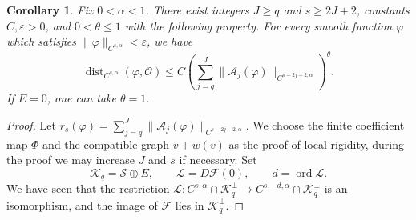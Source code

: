 \documentclass[11pt,reqno]{amsart}
\theoremstyle{corollary}
\newtheorem{corollary}[theorem]{Corollary}
\theoremstyle{conjecture}
\theoremstyle{assumption}
\theoremstyle{proposition}
\theoremstyle{remark}
\numberwithin{equation}{section}
\begin{document}
\begin{corollary}\label{cor:quantitative-rigidity}
Fix $0<\alpha<1$. There exist integers $J\geq q$ and $s\geq 2J+2$, constants $C,\varepsilon>0$, and $0<\theta\leq1$ with the following property. For every smooth function $\varphi$ which satisfies $\|\varphi\|_{C^{s,\alpha}}<\varepsilon$, we have
\begin{equation}\label{eq:quantitative-rigidity}
\operatorname{dist}_{C^{s,\alpha}}(\varphi,\mathcal O)\leq C\left(\sum_{j=q}^{J}\|\mathcal A_j(\varphi)\|_{C^{s-2j-2,\alpha}}\right)^\theta.
\end{equation}
If $E=0$, one can take $\theta=1$.
\end{corollary}

\begin{proof}
Let $r_s(\varphi)=\sum_{j=q}^{J}\|\mathcal A_j(\varphi)\|_{C^{s-2j-2,\alpha}}$. We choose the finite coefficient map $\Phi$ and the compatible graph $v+w(v)$ as the proof of local rigidity, during the proof we may increase $J$ and $s$ if necessary. Set
\[
\mathcal K_q=\mathcal S\oplus E,\qquad
\mathcal L=D\mathcal F(0),\qquad d=\operatorname{ord}\mathcal L.
\]
We have seen that the restriction $\mathcal L\colon C^{s,\alpha}\cap\mathcal K_q^\perp\longrightarrow C^{s-d,\alpha}\cap\mathcal K_q^\perp$ is an isomorphism, and the image of $\mathcal F$ lies in $\mathcal K_q^\perp$.


\end{proof}
\end{document}
